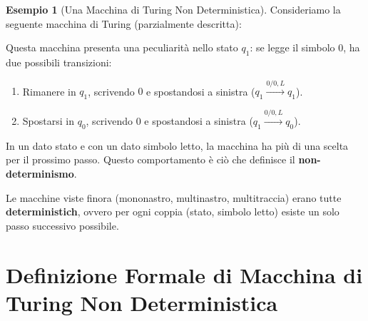\documentclass[a4paper]{article}
\theoremstyle{definition} %
\newtheorem{example}{Esempio}
\newcommand{\blankS}{\ensuremath{\raisebox{-0.15ex}{\scalebox{1.3}[0.7]{$\sqcup$}}}}
\begin{document}
\begin{example}[Una Macchina di Turing Non Deterministica]
Consideriamo la seguente macchina di Turing (parzialmente descritta):
\begin{center}
\end{center}
Questa macchina presenta una peculiarità nello stato $q_1$: se legge il simbolo $0$, ha due possibili transizioni:
\begin{enumerate}
    \item Rimanere in $q_1$, scrivendo $0$ e spostandosi a sinistra ($q_1 \xrightarrow{0/0, L} q_1$).
    \item Spostarsi in $q_0$, scrivendo $0$ e spostandosi a sinistra ($q_1 \xrightarrow{0/0, L} q_0$).
\end{enumerate}
In un dato stato e con un dato simbolo letto, la macchina ha più di una scelta per il prossimo passo. Questo comportamento è ciò che definisce il \textbf{non-determinismo}.
\end{example}

Le macchine viste finora (mononastro, multinastro, multitraccia) erano tutte \textbf{deterministich}, ovvero per ogni coppia (stato, simbolo letto) esiste un solo passo successivo possibile.

\section{Definizione Formale di Macchina di Turing Non Deterministica}
\end{document}
